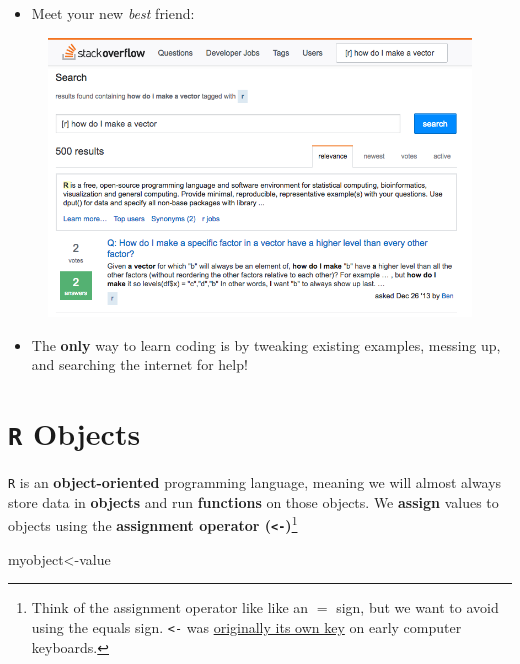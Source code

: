 \documentclass[]{book}
\newenvironment{Shaded}{\begin{snugshade}}{\end{snugshade}}
\newcommand{\NormalTok}[1]{#1}
\providecommand{\tightlist}{%
  \setlength{\itemsep}{0pt}\setlength{\parskip}{0pt}}
\let\rmarkdownfootnote\footnote%
\def\footnote{\protect\rmarkdownfootnote}
\theoremstyle{definition}
\theoremstyle{definition}
\theoremstyle{definition}
\theoremstyle{remark}
\begin{document}
\begin{itemize}
\tightlist
\item
  Meet your new \emph{best} friend:
\end{itemize}

\begin{figure}
\centering
\includegraphics{images/stackoverflow.png}
\caption{}
\end{figure}

\begin{itemize}
\tightlist
\item
  The \textbf{only} way to learn coding is by tweaking existing
  examples, messing up, and searching the internet for help!
\end{itemize}

\chapter{\texorpdfstring{\texttt{R}
Objects}{R Objects}}\label{r-objects}

\texttt{R} is an \textbf{object-oriented} programming language, meaning
we will almost always store data in \textbf{objects} and run
\textbf{functions} on those objects. We \textbf{assign} values to
objects using the \textbf{assignment operator
(\texttt{\textless{}-})}\footnote{Think of the assignment operator like
  like an \(=\) sign, but we want to avoid using the equals sign.
  \texttt{\textless{}-} was
  \href{https://twitter.com/kwbroman/status/747829864091127809}{originally
  its own key} on early computer keyboards.}

\begin{Shaded}
\begin{Highlighting}[]
\NormalTok{myobject<-value}
\end{Highlighting}
\end{Shaded}
\end{document}
